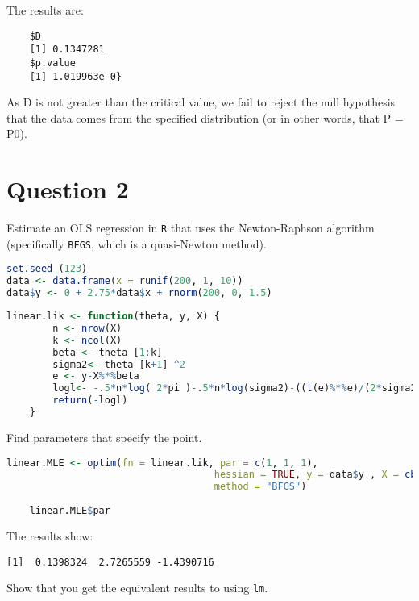 \documentclass[12pt,letterpaper]{article}
\begin{document}
\newpage
\noindent The results are: \begin{verbatim}
	$D
	[1] 0.1347281
	$p.value
	[1] 1.019963e-0}\end{verbatim}

\noindent  As D is not greater than the critical value, we fail to reject the null hypothesis that  the data comes from the specified distribution (or in other words, that P = P0).\\

\vspace{3in}

\newpage

\section*{Question 2}
\noindent Estimate an OLS regression in \texttt{R} that uses the Newton-Raphson algorithm (specifically \texttt{BFGS}, which is a quasi-Newton method).  
\vspace{.5cm}


\begin{lstlisting}[language=R]
set.seed (123)
data <- data.frame(x = runif(200, 1, 10))
data$y <- 0 + 2.75*data$x + rnorm(200, 0, 1.5) \end{lstlisting}

\begin{lstlisting}[language=R]
	linear.lik <- function(theta, y, X) {  
		n <- nrow(X)  
		k <- ncol(X)  
		beta <- theta [1:k]  
		sigma2<- theta [k+1] ^2  
		e <- y-X%*%beta  
		logl<- -.5*n*log( 2*pi )-.5*n*log(sigma2)-((t(e)%*%e)/(2*sigma2))
		return(-logl)
	}
	 \end{lstlisting}
		
\noindent Find parameters that specify the point. \\


\begin{lstlisting}[language=R]
	linear.MLE <- optim(fn = linear.lik, par = c(1, 1, 1), 
									hessian = TRUE, y = data$y , X = cbind(1, data$x),  
									method = "BFGS")
	
	linear.MLE$par\end{lstlisting}


\noindent The results show: \\

\begin{verbatim}
[1]  0.1398324  2.7265559 -1.4390716 \end{verbatim}


\noindent Show that you get the equivalent results to using \texttt{lm}. \\
\end{document}
